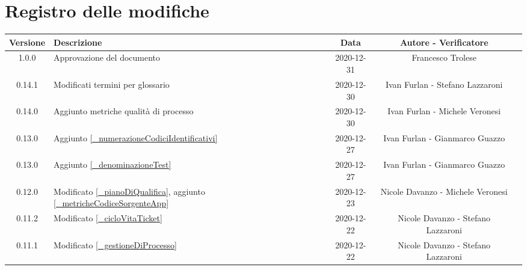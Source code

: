 \section*{Registro delle modifiche}

\begin{center}
	\begin{longtable}{|c|p{5cm}|c|c|c|}
		\hline
		\rowcolor{lighter-grayer}
		\textbf{Versione} & \textbf{Descrizione} & \textbf{Data} & \textbf{Autore - Verificatore} \\
		\hline
		\endfirsthead

		1.0.0 & Approvazione del documento & 2020-12-31 & Francesco Trolese \\
		0.14.1 & Modificati termini per glossario & 2020-12-30 & Ivan Furlan - Stefano Lazzaroni \\
		0.14.0 & Aggiunto metriche qualità di processo & 2020-12-30 & Ivan Furlan - Michele Veronesi \\
		0.13.0 & Aggiunto \ref{_numerazioneCodiciIdentificativi} & 2020-12-27 & Ivan Furlan - Gianmarco Guazzo \\
		0.13.0 & Aggiunto \ref{_denominazioneTest} & 2020-12-27 & Ivan Furlan - Gianmarco Guazzo  \\
		0.12.0 & Modificato \ref{_pianoDiQualifica}, aggiunto \ref{_metricheCodiceSorgenteApp} & 2020-12-23 & Nicole Davanzo - Michele Veronesi  \\
		
		0.11.2 & Modificato \ref{_cicloVitaTicket} & 2020-12-22& Nicole Davanzo - Stefano Lazzaroni  \\
		0.11.1 & Modificato \ref{_gestioneDiProcesso} & 2020-12-22 & Nicole Davanzo - Stefano Lazzaroni  \\


\end{longtable}
\end{center}
